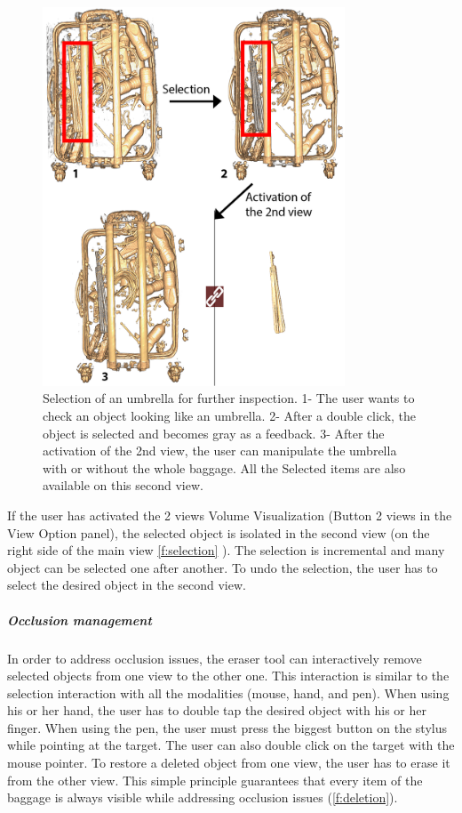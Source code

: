 \begin{figure}
\centering   
	\includegraphics[width=9cm]{Figures/selection.png}
	\caption{ Selection of an umbrella for further inspection.  1- The user wants to check an object looking like an umbrella. 2- After a double click, the object is selected and becomes gray as a feedback. 3- After the activation of the 2nd view, the user can manipulate the umbrella with or without the whole baggage. All the Selected items are also available on this second view. }
	\label{f:selection}
\end{figure}



If the user has activated the 2 views Volume Visualization (Button 2 views in the View Option panel), the selected object is isolated in the second view (on the right side of the main view \autoref{f:selection} ). The selection is incremental and many object can be selected one after another. To undo the selection, the user has to select the desired object in the second view.

\subparagraph{Occlusion management}

In order to address occlusion issues, the eraser tool can interactively remove selected objects from one view to the other one. This interaction is similar to the selection interaction with all the modalities (mouse, hand, and pen). When using his or her hand, the user has to double tap the desired object with his or her finger. When using the pen, the user must press the biggest button on the stylus while pointing at the target. The user can also double click on the target with the mouse pointer. To restore a deleted object from one view, the user has to erase it from the other view. This simple principle guarantees that every item of the baggage is always visible while addressing occlusion issues (\autoref{f:deletion}).

